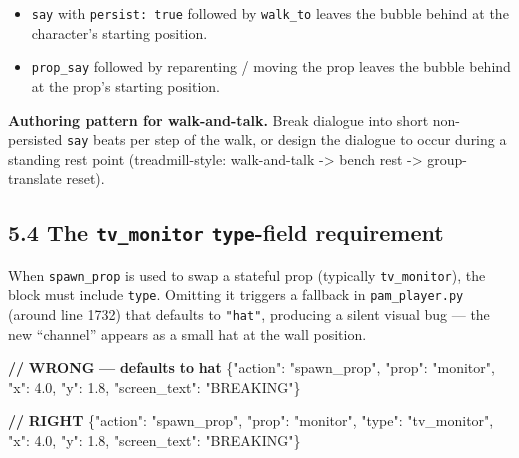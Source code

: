 \documentclass[
  11pt,
]{book}
\newenvironment{Shaded}{}{}
\newcommand{\DataTypeTok}[1]{\textcolor[rgb]{0.56,0.13,0.00}{#1}}
\newcommand{\ErrorTok}[1]{\textcolor[rgb]{1.00,0.00,0.00}{\textbf{#1}}}
\newcommand{\FloatTok}[1]{\textcolor[rgb]{0.25,0.63,0.44}{#1}}
\newcommand{\FunctionTok}[1]{\textcolor[rgb]{0.02,0.16,0.49}{#1}}
\newcommand{\StringTok}[1]{\textcolor[rgb]{0.25,0.44,0.63}{#1}}
\providecommand{\tightlist}{%
  \setlength{\itemsep}{0pt}\setlength{\parskip}{0pt}}
\begin{document}
\begin{itemize}
\tightlist
\item
  \texttt{say} with \texttt{persist:\ true} followed by
  \texttt{walk\_to} leaves the bubble behind at the character's starting
  position.
\item
  \texttt{prop\_say} followed by reparenting / moving the prop leaves
  the bubble behind at the prop's starting position.
\end{itemize}

\textbf{Authoring pattern for walk-and-talk.} Break dialogue into short
non-persisted \texttt{say} beats per step of the walk, or design the
dialogue to occur during a standing rest point (treadmill-style:
walk-and-talk -\textgreater{} bench rest -\textgreater{} group-translate
reset).

\subsection{\texorpdfstring{5.4 The \texttt{tv\_monitor}
\texttt{type}-field
requirement}{5.4 The tv\_monitor type-field requirement}}\label{the-tv_monitor-type-field-requirement}

When \texttt{spawn\_prop} is used to swap a stateful prop (typically
\texttt{tv\_monitor}), the block must include \texttt{type}. Omitting it
triggers a fallback in \texttt{pam\_player.py} (around line 1732) that
defaults to \texttt{"hat"}, producing a silent visual bug --- the new
``channel'' appears as a small hat at the wall position.

\begin{Shaded}
\begin{Highlighting}[]
\ErrorTok{//} \ErrorTok{WRONG} \ErrorTok{—} \ErrorTok{defaults} \ErrorTok{to} \ErrorTok{hat}
\FunctionTok{\{}\DataTypeTok{"action"}\FunctionTok{:} \StringTok{"spawn\_prop"}\FunctionTok{,} \DataTypeTok{"prop"}\FunctionTok{:} \StringTok{"monitor"}\FunctionTok{,}
 \DataTypeTok{"x"}\FunctionTok{:} \FloatTok{4.0}\FunctionTok{,} \DataTypeTok{"y"}\FunctionTok{:} \FloatTok{1.8}\FunctionTok{,} \DataTypeTok{"screen\_text"}\FunctionTok{:} \StringTok{"BREAKING"}\FunctionTok{\}}

\ErrorTok{//} \ErrorTok{RIGHT}
\FunctionTok{\{}\DataTypeTok{"action"}\FunctionTok{:} \StringTok{"spawn\_prop"}\FunctionTok{,} \DataTypeTok{"prop"}\FunctionTok{:} \StringTok{"monitor"}\FunctionTok{,}
 \DataTypeTok{"type"}\FunctionTok{:} \StringTok{"tv\_monitor"}\FunctionTok{,}
 \DataTypeTok{"x"}\FunctionTok{:} \FloatTok{4.0}\FunctionTok{,} \DataTypeTok{"y"}\FunctionTok{:} \FloatTok{1.8}\FunctionTok{,} \DataTypeTok{"screen\_text"}\FunctionTok{:} \StringTok{"BREAKING"}\FunctionTok{\}}
\end{Highlighting}
\end{Shaded}
\end{document}
